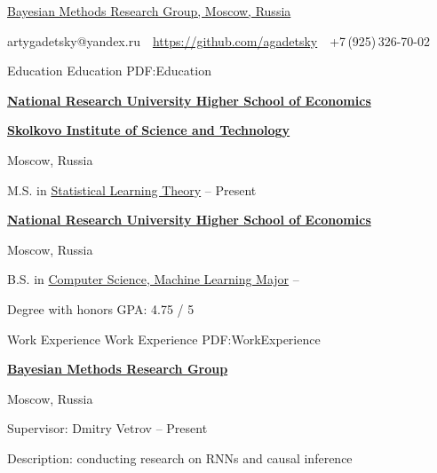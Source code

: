 \documentclass[letterpaper,MMMyyyy,nonstopmode]{simpleresumecv}
\newcommand{\CVAuthor}{Artyom Gadetsky}
\begin{document}

\Title{\CVAuthor}

\begin{SubTitle}
\href{http://bayesgroup.ru}{Bayesian Methods Research Group, Moscow, Russia}
\par
artygadetsky@yandex.ru
\,\SubBulletSymbol\,
\href{https://github.com/agadetsky}{https://github.com/agadetsky}
\,\SubBulletSymbol\,
+7\,(925)\,326-70-02
\end{SubTitle}

\begin{Body}


\Section
{Education}
{Education}
{PDF:Education}

\Entry
\href{https://www.hse.ru/en/}
{\textbf{National Research University Higher School of Economics}}
\par
\href{https://www.skoltech.ru/en/}{\textbf{Skolkovo Institute of Science and Technology}}
\par
Moscow, Russia

\Gap
\BulletItem
M.S. in
\href{https://www.hse.ru/en/ma/sltheory/}
{Statistical Learning Theory}
\hfill
{} --
Present
\Gap

\Entry
\href{https://www.hse.ru/en/}
{\textbf{National Research University Higher School of Economics}}
\par
Moscow, Russia

\Gap
\BulletItem
B.S. in
\href{https://www.hse.ru/en/ba/ami/}
{Computer Science, Machine Learning Major}
\hfill
{} --
\begin{Detail}
\SubBulletItem
Degree with honors
\SubBulletItem
GPA: 4.75 / 5
\end{Detail}


\Section
{Work Experience}
{Work Experience}
{PDF:WorkExperience}

\Entry
\href{http://bayesgroup.ru}
{\textbf{Bayesian Methods Research Group}}
\par
Moscow, Russia

\Gap
\BulletItem
Supervisor: Dmitry Vetrov
\hfill
{} --
Present
\begin{Detail}
\SubBulletItem
Description: conducting research on RNNs and causal inference
\end{Detail}


\end{Body}
\end{document}
